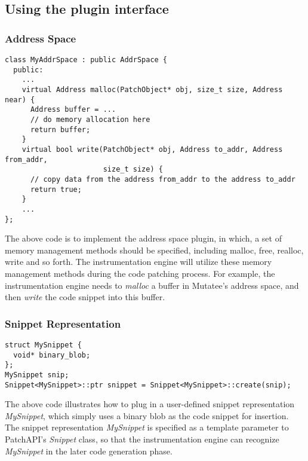 \subsection{Using the plugin interface}

\subsubsection{Address Space}
\lstset{numbers=left}
\begin{lstlisting}
class MyAddrSpace : public AddrSpace {
  public:
    ...
    virtual Address malloc(PatchObject* obj, size_t size, Address near) {
      Address buffer = ...
      // do memory allocation here
      return buffer;
    }
    virtual bool write(PatchObject* obj, Address to_addr, Address from_addr,
                       size_t size) {
      // copy data from the address from_addr to the address to_addr
      return true;
    }
    ...
};
\end{lstlisting}
The above code is to implement the address space plugin, in which, a set of
memory management methods should be specified, including malloc, free, realloc,
write and so forth. The instrumentation engine will utilize these memory
management methods during the code patching process. For example, the
instrumentation engine needs to \emph{malloc} a buffer in Mutatee's address
space, and then \emph{write} the code snippet into this buffer.

\subsubsection{Snippet Representation} \label{sec-example-snip}
\lstset{numbers=left}
\begin{lstlisting}
struct MySnippet {
  void* binary_blob;
};
MySnippet snip;
Snippet<MySnippet>::ptr snippet = Snippet<MySnippet>::create(snip);
\end{lstlisting}
The above code illustrates how to plug in a user-defined snippet representation
\emph{MySnippet}, which simply uses a binary blob as the code snippet for
insertion. The snippet representation \emph{MySnippet} is specified as a
template parameter to PatchAPI's \emph{Snippet} class, so that the
instrumentation engine can recognize \emph{MySnippet} in the later code
generation phase.

